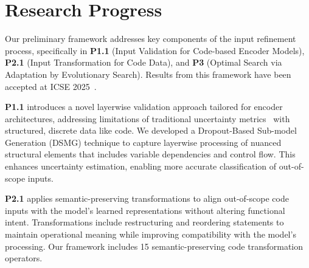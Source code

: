 \section{Research Progress}

Our preliminary framework addresses key components of the input refinement process, specifically in \textbf{P1.1} (Input Validation for Code-based Encoder Models), \textbf{P2.1} (Input Transformation for Code Data), and \textbf{P3} (Optimal Search via Adaptation by Evolutionary Search). Results from this framework have been accepted at ICSE 2025~\cite{rathnasuriya2025codeimprove}.


\textbf{P1.1} introduces a novel layerwise validation approach tailored for encoder architectures, addressing limitations of traditional uncertainty metrics~\cite{guo2017calibration,wang2020dissector,hendrycks2018baseline,gal2016dropout, alon2019code2vec,xiao2019quantifying,vasudevan2019towards,corbiere2019addressing, monarch2021human, steinhardt2016unsupervised,shannon1948mathematical} with structured, discrete data like code. We developed a Dropout-Based Sub-model Generation (DSMG) technique to capture layerwise processing of nuanced structural elements that includes variable dependencies and control flow. This enhances uncertainty estimation, enabling more accurate classification of out-of-scope inputs.


\textbf{P2.1} applies semantic-preserving transformations to align out-of-scope code inputs with the model’s learned representations without altering functional intent. Transformations include restructuring and reordering statements to maintain operational meaning while improving compatibility with the model’s processing. Our framework includes 15 semantic-preserving code transformation operators. 

